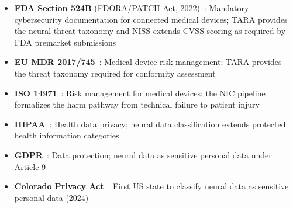 \begin{itemize}
  \item \textbf{FDA Section 524B} (FDORA/PATCH Act, 2022)~\cite{fda524b}:
        Mandatory cybersecurity documentation for connected medical devices;
        TARA provides the neural threat taxonomy and NISS extends CVSS scoring
        as required by FDA premarket submissions
  \item \textbf{EU MDR 2017/745}~\cite{eumdr2017}: Medical device risk management;
        TARA provides the threat taxonomy required for conformity assessment
  \item \textbf{ISO 14971}~\cite{iso14971}: Risk management for medical devices;
        the NIC pipeline formalizes the harm pathway from technical failure to
        patient injury
  \item \textbf{HIPAA}~\cite{hipaa1996}: Health data privacy; neural data
        classification extends protected health information categories
  \item \textbf{GDPR}~\cite{gdpr2016}: Data protection; neural data as sensitive
        personal data under Article 9
  \item \textbf{Colorado Privacy Act}~\cite{colorado2024neuraldata}: First US state
        to classify neural data as sensitive personal data (2024)
\end{itemize}
